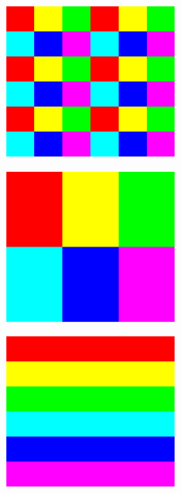 \begin{figure}[ht]
        \centering
        \begin{subfigure}[b]{0.3\textwidth}
                \centering
\includegraphics[height=5cm,width=\textwidth]{pbdDEMO-include/pics/bc}
                \caption{}
        \end{subfigure}
        \hspace{.1cm}
        \begin{subfigure}[b]{0.3\textwidth}
                \centering
\includegraphics[height=5cm,width=\textwidth]{pbdDEMO-include/pics/block}
                \caption{}
        \end{subfigure}
        \hspace{.1cm}
        \begin{subfigure}[b]{0.3\textwidth}
                \centering
\includegraphics[height=5cm,width=\textwidth]{pbdDEMO-include/pics/rowblock}
                \caption{}
        \end{subfigure}

\end{figure}
